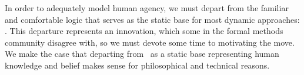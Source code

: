 In order to adequately model human agency, we must depart from the familiar and comfortable logic that serves as the static base for most dynamic approaches: \SFive. This departure represents an innovation, which some in the formal methods community disagree with, so we must devote some time to motivating the move. We make the case that departing from \SFive\ as a static base representing human knowledge and belief makes sense for philosophical and technical reasons.


